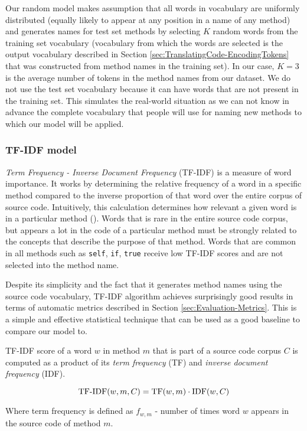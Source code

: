 Our random model makes assumption that all words in vocabulary are uniformly distributed (equally likely to appear at any position in a name of any method) and generates names for test set methods by selecting $K$ random words from the training set vocabulary (vocabulary from which the words are selected is the output vocabulary described in Section \ref{sec:TranslatingCode-EncodingTokens} that was constructed from method names in the training set). In our case, $K=3$ is the average number of tokens in the method names from our dataset. We do not use the test set vocabulary because it can have words that are not present in the training set. This simulates the real-world situation as we can not know in advance the complete vocabulary that people will use for naming new methods to which our model will be applied.

\subsubsection{TF-IDF model}

\textit{Term Frequency - Inverse Document Frequency} (TF-IDF) is a measure of word importance. It works by determining the relative frequency of a word in a specific method compared to the inverse proportion of that word over the entire corpus of source code. Intuitively, this calculation determines how relevant a given word is in a particular method (\cite{Ramo03}). Words that is rare in the entire source code corpus, but appears a lot in the code of a particular method must be strongly related to the concepts that describe the purpose of that method. Words that are common in all methods such as \texttt{self}, \texttt{if}, \texttt{true} receive low TF-IDF scores and are not selected into the method name.

Despite its simplicity and the fact that it generates method names using the source code vocabulary, TF-IDF algorithm achieves surprisingly good results in terms of automatic metrics described in Section \ref{sec:Evaluation-Metrics}. This is a simple and effective statistical technique that can be used as a good baseline to compare our model to.

TF-IDF score of a word $w$ in method $m$ that is part of a source code corpus $C$ is computed as a product of its \textit{term frequency} (TF) and \textit{inverse document frequency} (IDF).

\[ \text{TF-IDF}(w, m, C) = \text{TF}(w, m) \cdot \text{IDF}(w, C) \]

Where term frequency is defined as $f_{w,m}$ - number of times word $w$ appears in the source code of method $m$.

